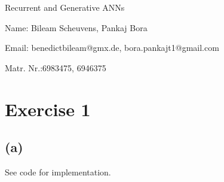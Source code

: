 \documentclass[11pt]{article}
\numberwithin{equation}{section}
\begin{document}
\begin{center}
    \sc Recurrent and Generative ANNs
\end{center}

\noindent Name: Bileam Scheuvens, Pankaj Bora

\noindent Email: benedictbileam@gmx.de, bora.pankajt1@gmail.com

\noindent Matr. Nr.:6983475, 6946375



\section{Exercise 1}
\subsection{(a)}
See code for implementation.
\end{document}
